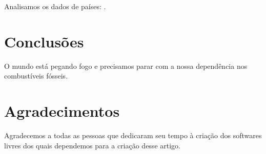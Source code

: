 \documentclass[twocolumn,A4]{article}
\begin{document}
Analisamos os dados de \NPaises{} países: \Paises{}.

%
%
\section{Conclusões}

O mundo está pegando fogo e precisamos parar com a nossa dependência nos
combustíveis fósseis.

\section*{Agradecimentos}

Agradecemos a todas as pessoas que dedicaram seu tempo à criação dos softwares
livres dos quais dependemos para a criação desse artigo.



\end{document}
